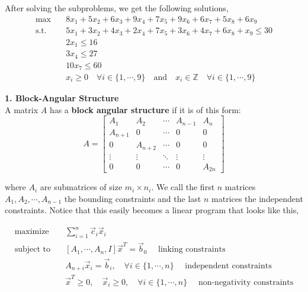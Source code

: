 \documentclass[11pt]{article}
\begin{document}
\noindent After solving the subproblems, we get the following solutions,\\

\begin{align}
\text{max} & \quad 8 x_1+5 x_2+6 x_3+9 x_4+7 x_5+9 x_6+6 x_7+5 x_8  + 6 x_9 \nonumber \\ 
\text{s.t.} & \quad 5 x_1+ 3 x_2+4 x_3+2 x_4+7 x_5+3 x_6+4 x_7+6 x_8 + x_9 \leq 30 \nonumber \\
&\quad 2 x_1 \leq 16\nonumber\\ 
& \quad  3 x_4 \leq 27 \nonumber\\
& \quad  10 x_7 \leq 60 \nonumber\\
& \quad x_i \geq 0 \quad \forall i \in \{1, \cdots,9\} \quad \text{and} \quad x_i \in \mathbb{Z} \quad \forall i \in \{1, \cdots,9\} \nonumber
\end{align} \nonumber

\newpage 

\noindent \textbf{\large{1. Block-Angular Structure}}
\\

\noindent A matrix $A$ has a \textbf{block angular structure} if it is of this form:
\[
A = \begin{bmatrix}
A_{1} & A_{2} & \cdots & A_{n-1} & A_{n} \\
A_{n+1} & 0 & \cdots & 0 & 0 \\
0 & A_{n+2} & \cdots & 0 & 0 \\
\vdots & \vdots & \ddots & \vdots & \vdots \\
0 & 0 & \cdots & 0 & A_{2n}
\end{bmatrix}
\]

\noindent where $A_{i}$ are submatrices of size $m_i \times n_i$. We call the first $n$ matrices $A_1, A_2, \cdots, A_{n-1}$ the bounding constraints and the last $n$ matrices the independent constraints. Notice that this easily becomes a linear program that looks like this, 

$$
\begin{aligned}
\text{maximize} \quad & \sum_{i=1}^{n} \vec{c}_i \vec{x}_i \\
\text{subject to} \quad & [A_1, \cdots, A_n, I] \vec{x}^T = \vec{b}_0 \quad \text{  linking constraints}\\
& A_{n+i} \vec{x}_i = \vec{b}_i, \quad \forall i \in \{1, \cdots, n\} \quad \text{  independent constraints} \\
& \vec{x}^T \geq 0, \quad \vec{x}_i \geq 0, \quad \forall i \in \{1, \cdots, n\} \quad \text{  non-negativity constraints}
\end{aligned}
$$
\end{document}
